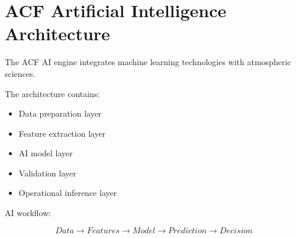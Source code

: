 \section{ACF Artificial Intelligence Architecture}


The ACF AI engine integrates machine learning technologies
with atmospheric sciences.



The architecture contains:


\begin{itemize}

\item Data preparation layer

\item Feature extraction layer

\item AI model layer

\item Validation layer

\item Operational inference layer

\end{itemize}



AI workflow:


\begin{equation}
Data
\rightarrow
Features
\rightarrow
Model
\rightarrow
Prediction
\rightarrow
Decision
\end{equation}

